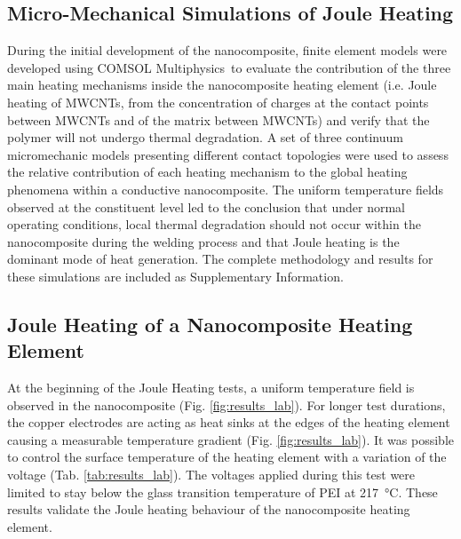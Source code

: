 \subsection{Micro-Mechanical Simulations of Joule Heating}

During the initial development of the nanocomposite, finite element models were developed using COMSOL Mul\-ti\-phy\-sics\-\textregistered \ to evaluate the contribution of the three main heating mechanisms inside the nanocomposite heating element (i.e. Joule heating of MWCNTs, from the concentration of charges at the contact points between MWCNTs and of the matrix between MWCNTs) and verify that the polymer will not undergo thermal degradation.  
A set of three continuum micromechanic models presenting different contact topologies were used to assess the relative contribution of each heating mechanism to the global heating phenomena within a conductive nanocomposite. 
The uniform temperature fields observed at the constituent level led to the conclusion that under normal operating conditions, local thermal degradation should not occur within the nanocomposite during the welding process and that Joule heating is the dominant mode of heat generation. 
The complete methodology and results for these simulations are included as Supplementary Information. 

\subsection{Joule Heating of a Nanocomposite Heating Element}

At the beginning of the Joule Heating tests, a uniform temperature field is observed in the nanocomposite (Fig. \ref{fig:results_lab}). 
For longer test durations, the copper electrodes are acting as heat sinks at the edges of the heating element causing a measurable temperature gradient (Fig. \ref{fig:results_lab}). 
It was possible to control the surface temperature of the heating element with a variation of the voltage (Tab. \ref{tab:results_lab}). 
The voltages applied during this test were limited to stay below the glass transition temperature of PEI at \SI{217}{\celsius}. 
These results validate the Joule heating behaviour of the nanocomposite heating element. 

